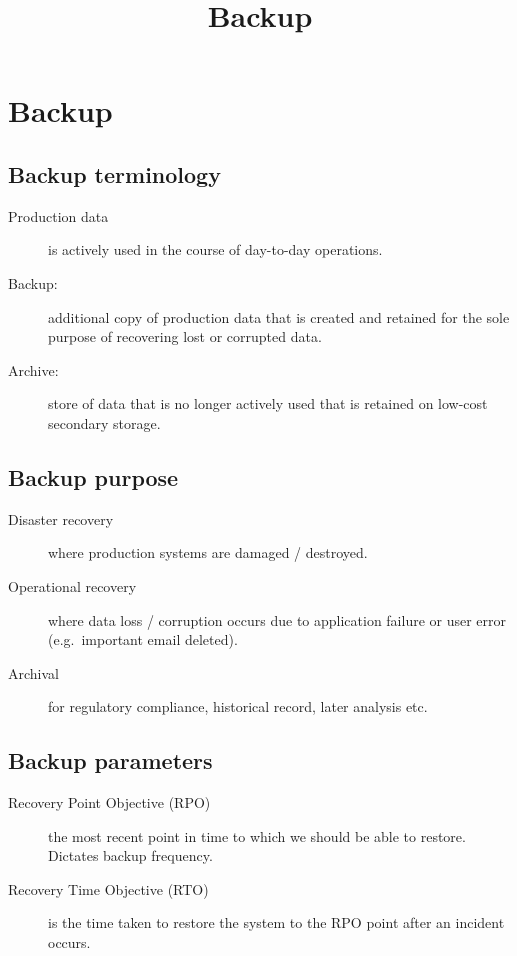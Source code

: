 \documentclass[slides]{pgnotes}
\title{Backup}
\begin{document}
\maketitle

\tableofcontents

\section{Backup}

\subsection{Backup terminology}
\label{sec:backup-terminology}

\begin{description}
\item[Production data]
is actively used in the course of day-to-day operations.
\item[Backup:]
additional copy of production data that is created and retained for the
sole purpose of recovering lost or corrupted data.
\item[Archive:]
store of data that is no longer actively used that is retained on
low-cost secondary storage.
\end{description}


\subsection{Backup purpose}
\label{sec:backup-purpose}

\begin{description}
\item[Disaster recovery]
where production systems are damaged / destroyed.
\item[Operational recovery]
where data loss / corruption occurs due to application failure or user
error (e.g.~important email deleted).
\item[Archival]
for regulatory compliance, historical record, later analysis etc.
\end{description}

\subsection{Backup parameters}
\label{sec:backup-parameters}

\begin{description}
\item[Recovery Point Objective (RPO)]
the most recent point in time to which we should be able to restore.
Dictates backup frequency.
\item[Recovery Time Objective (RTO)]
is the time taken to restore the system to the RPO point after an
incident occurs.
\end{description}
\end{document}

